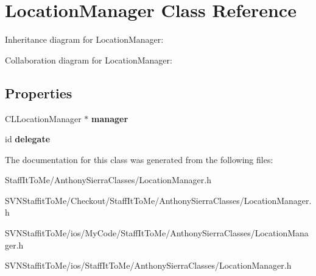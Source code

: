 \hypertarget{interface_location_manager}{
\section{\-Location\-Manager \-Class \-Reference}
\label{interface_location_manager}
}


\-Inheritance diagram for \-Location\-Manager\-:


\-Collaboration diagram for \-Location\-Manager\-:
\subsection*{\-Properties}
\begin{DoxyCompactItemize}
\item 
\hypertarget{interface_location_manager_a9eb1a0afbcb9236d55540007840c78a8}{
\-C\-L\-Location\-Manager $\ast$ {\bfseries manager}}
\label{interface_location_manager_a9eb1a0afbcb9236d55540007840c78a8}

\item 
\hypertarget{interface_location_manager_a14e691be85666ec5763b595ced928f60}{
id {\bfseries delegate}}
\label{interface_location_manager_a14e691be85666ec5763b595ced928f60}

\end{DoxyCompactItemize}


\-The documentation for this class was generated from the following files\-:\begin{DoxyCompactItemize}
\item 
\-Staff\-It\-To\-Me/\-Anthony\-Sierra\-Classes/\-Location\-Manager.\-h\item 
\-S\-V\-N\-Staffit\-To\-Me/\-Checkout/\-Staff\-It\-To\-Me/\-Anthony\-Sierra\-Classes/\-Location\-Manager.\-h\item 
\-S\-V\-N\-Staffit\-To\-Me/ios/\-My\-Code/\-Staff\-It\-To\-Me/\-Anthony\-Sierra\-Classes/\-Location\-Manager.\-h\item 
\-S\-V\-N\-Staffit\-To\-Me/ios/\-Staff\-It\-To\-Me/\-Anthony\-Sierra\-Classes/\-Location\-Manager.\-h\end{DoxyCompactItemize}
